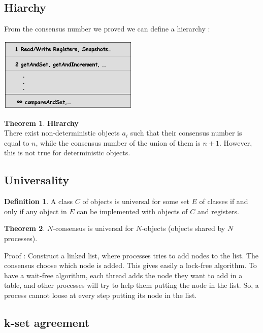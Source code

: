 \documentclass{article}
\theoremstyle{definition}
\newtheorem{definition}{Definition}[section]
\newtheorem{theorem}{Theorem}
\begin{document}
\subsection{Hiarchy}

From the consensus number we proved we can define a hierarchy : 

\begin{center}
\includegraphics[width=0.5\textwidth]{cons_hirachy} 
\end{center}

\begin{theorem}\textbf{Hirarchy}\\
There exist non-deterministic objects {$a_i$} such that their consensus number is equal to $n$, while the consensus number of the union of them is $n + 1$. However, this is not true for deterministic objects.
\end{theorem} 

\subsection{Universality}

\begin{definition}
A class $C$ of objects is universal for some set $E$ of classes if and only if any object in $E$ can be implemented with objects of $C$ and registers.
\end{definition}

\begin{theorem}
$N$-consensus is universal for $N$-objects (objects shared by $N$ processes).
\end{theorem}

Proof :  Construct a linked list, where processes tries to add nodes to the list. The consensus choose which node is added. This gives easily a lock-free algorithm. To have a wait-free algorithm, each thread adds the node they want to add in a table, and other processes will try to help them putting the node in the list. So, a process cannot loose at every step putting its node in the list.

\subsection{k-set agreement}
\end{document}

